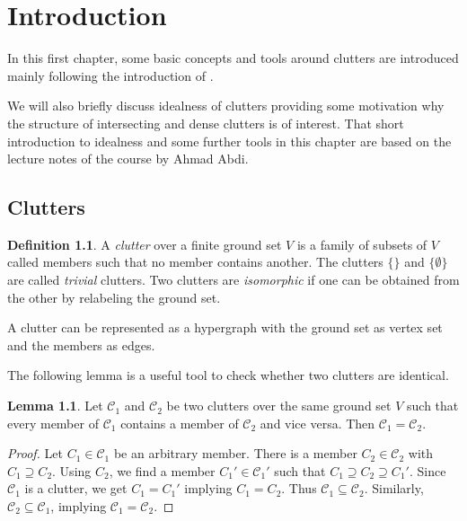 \documentclass[a4paper, 12pt]{scrbook}
\theoremstyle{definition}
\newtheorem*{definition}{Definition}
\newtheorem{lemma}[theorem]{Lemma}
\begin{document}
   \tableofcontents
   \chapter{Introduction}
   In this first chapter, some basic concepts and tools around clutters are introduced mainly following the introduction of \cite{restrictions}.

   We will also briefly discuss idealness of clutters providing some motivation why the structure of intersecting and dense clutters is of interest. That short introduction to idealness and some further tools in this chapter are based on the lecture notes of the course  by Ahmad Abdi\cite{course}.
   \section{Clutters}
   \begin{definition}
       A \emph{clutter} over a finite ground set $V$ is a family of subsets of $V$ called members such that no member contains another\cite{blocker}.
       The clutters $\{\}$ and $\{\emptyset\}$ are called \emph{trivial} clutters.
       Two clutters are \emph{isomorphic} if one can be obtained from the other by relabeling the ground set.
   \end{definition}
   A clutter can be represented as a hypergraph with the ground set as vertex set and the members as edges.

   The following lemma is a useful tool to check whether two clutters are identical.
   \begin{lemma}\label{equalclutters}
       Let $\mathcal{C}_1$ and $\mathcal{C}_2$ be two clutters over the same ground set $V$ such that every member of $\mathcal{C}_1$ contains a member of $\mathcal{C}_2$ and vice versa.
       Then $\mathcal{C}_1=\mathcal{C}_2$.
   \end{lemma}

   \begin{proof}
       Let $C_1 \in \mathcal{C}_1$ be an arbitrary member.
       There is a member $C_2 \in \mathcal{C}_2$ with $C_1 \supseteq C_2$.
       Using $C_2$, we find a member $C_1' \in \mathcal{C}_1'$ such that $C_1 \supseteq C_2 \supseteq C_1'$.
       Since $\mathcal{C}_1$ is a clutter, we get $C_1=C_1'$ implying $C_1=C_2$.
       Thus $\mathcal{C}_1 \subseteq \mathcal{C}_2$.
       Similarly, $\mathcal{C}_2 \subseteq \mathcal{C}_1$, implying $\mathcal{C}_1=\mathcal{C}_2$.
   \end{proof}
\end{document}
